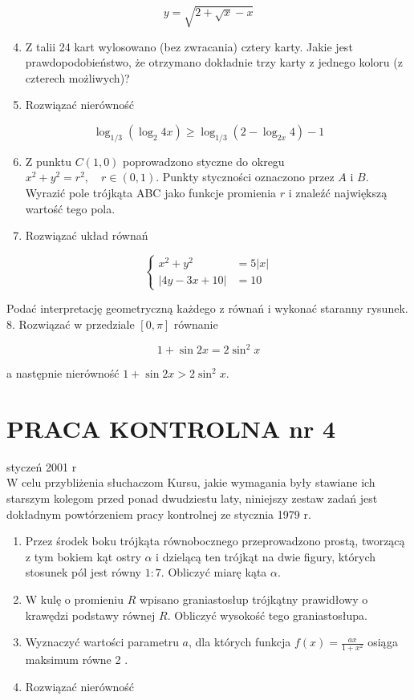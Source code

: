 \documentclass[10pt]{article}
\begin{document}
$$
y=\sqrt{2+\sqrt{x}-x}
$$

\begin{enumerate}
  \setcounter{enumi}{3}
  \item Z talii 24 kart wylosowano (bez zwracania) cztery karty. Jakie jest prawdopodobieństwo, że otrzymano dokładnie trzy karty z jednego koloru (z czterech możliwych)?
  \item Rozwiązać nierówność
\end{enumerate}

$$
\log _{1 / 3}\left(\log _{2} 4 x\right) \geqslant \log _{1 / 3}\left(2-\log _{2 x} 4\right)-1
$$

\begin{enumerate}
  \setcounter{enumi}{5}
  \item Z punktu $C(1,0)$ poprowadzono styczne do okregu $x^{2}+y^{2}=r^{2}, \quad r \in(0,1)$. Punkty styczności oznaczono przez $A$ i $B$. Wyrazić pole trójkąta ABC jako funkcje promienia $r$ i znaleźć największą wartość tego pola.
  \item Rozwiązać układ równań
\end{enumerate}

$$
\begin{cases}x^{2}+y^{2} & =5|x| \\ |4 y-3 x+10| & =10\end{cases}
$$

Podać interpretację geometryczną każdego z równań i wykonać staranny rysunek.\\
8. Rozwiązać w przedziale $[0, \pi]$ równanie

$$
1+\sin 2 x=2 \sin ^{2} x
$$

a następnie nierówność $1+\sin 2 x>2 \sin ^{2} x$.

\section*{PRACA KONTROLNA nr 4}
styczeń 2001 r\\
W celu przybliżenia słuchaczom Kursu, jakie wymagania były stawiane ich starszym kolegom przed ponad dwudziestu laty, niniejszy zestaw zadań jest dokładnym powtórzeniem pracy kontrolnej ze stycznia 1979 r.

\begin{enumerate}
  \item Przez środek boku trójkąta równobocznego przeprowadzono prostą, tworzącą z tym bokiem kąt ostry $\alpha$ i dzielącą ten trójkąt na dwie figury, których stosunek pól jest równy $1: 7$. Obliczyć miarę kąta $\alpha$.
  \item W kulę o promieniu $R$ wpisano graniastosłup trójkątny prawidłowy o krawędzi podstawy równej $R$. Obliczyć wysokość tego graniastosłupa.
  \item Wyznaczyć wartości parametru $a$, dla których funkcja $f(x)=\frac{a x}{1+x^{2}}$ osiąga maksimum równe 2 .
  \item Rozwiązać nierówność
\end{enumerate}
\end{document}
